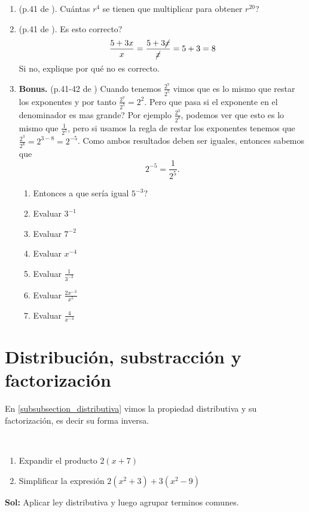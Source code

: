 \begin{enumerate}
	\item (p.41 de \cite{Aops_algebra}). Cuántas $r^4$ se tienen que multiplicar para obtener $r^{20}$?
	
	\item (p.41 de \cite{Aops_algebra}). Es esto correcto?
	\[\frac{5+3x}{x} = \frac{5+3\cancel{x}}{\cancel{x}}=5+3=8\]
	Si no, explique por qué no es correcto.
	
	\item \textbf{Bonus.} (p.41-42 de \cite{Aops_algebra}) Cuando tenemos $\frac{2^7}{2^5}$ vimos que es lo mismo que restar los exponentes y por tanto $\frac{2^7}{2^5}=2^2$. Pero que pasa si el exponente en el denominador es mas grande? Por ejemplo $\frac{2^3}{2^8}$, podemos ver que esto es lo mismo que $\frac{1}{2^5}$, pero si usamos la regla de restar los exponentes tenemos que $\frac{2^3}{2^8}=2^{3-8}=2^{-5}$. Como ambos resultados deben ser iguales, entonces sabemos que \[2^{-5} = \frac{1}{2^5}.\]
	\begin{enumerate}[label=\Alph*)]
		\item Entonces a que sería igual $5^{-3}$?
		\item Evaluar $3^{-1}$
		\item Evaluar $7^{-2}$
		\item Evaluar $x^{-4}$
		\item Evaluar $\frac{1}{3^{-2}}$
		\item Evaluar $\frac{2x^{-3}}{x^5}$
		\item Evaluar $\frac{4}{x^{-4}}$								
	\end{enumerate}
	
\end{enumerate}
\newpage

\section{Distribución, substracción y factorización}\label{section:distribucion_substraccion_factorizacion}

En \ref{subsubsection_distributiva} vimos la propiedad distributiva y su factorización, es decir su forma inversa.

\begin{ejemplo}{\ \\}
	\begin{multicols}{2}
		\begin{enumerate}[label=\Alph*)]
			\item Expandir el producto $2(x+7)$
			\item Simplificar la expresión $2(x^2+3) + 3(x^2-9)$
		\end{enumerate}
	\end{multicols}
	\textbf{Sol: }Aplicar ley distributiva y luego agrupar terminos comunes.
\end{ejemplo}


